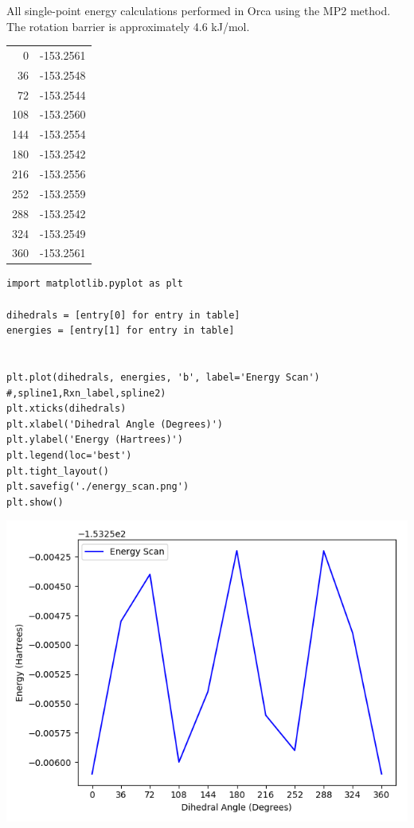 \documentclass[11pt]{article}
\begin{document}
All single-point energy calculations performed in Orca using the MP2 method. The rotation barrier is approximately 4.6 kJ/mol.

\begin{center}
\label{energies}
\begin{tabular}{rr}
0 & -153.2561\\
36 & -153.2548\\
72 & -153.2544\\
108 & -153.2560\\
144 & -153.2554\\
180 & -153.2542\\
216 & -153.2556\\
252 & -153.2559\\
288 & -153.2542\\
324 & -153.2549\\
360 & -153.2561\\
\end{tabular}
\end{center}


\begin{verbatim}
import matplotlib.pyplot as plt

dihedrals = [entry[0] for entry in table]
energies = [entry[1] for entry in table]


plt.plot(dihedrals, energies, 'b', label='Energy Scan')
#,spline1,Rxn_label,spline2)
plt.xticks(dihedrals)
plt.xlabel('Dihedral Angle (Degrees)')
plt.ylabel('Energy (Hartrees)')
plt.legend(loc='best')
plt.tight_layout()
plt.savefig('./energy_scan.png')
plt.show()
\end{verbatim}

\begin{center}
\includegraphics[width=.9\linewidth]{./energyscan.png}
\end{center}
\end{document}
